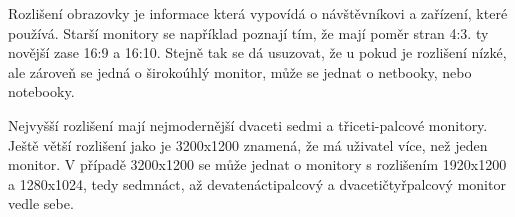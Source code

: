 \documentclass[bc,male,java,dept456]{diploma}						%
\begin{document}
Rozlišení obrazovky je informace která vypovídá o návštěvníkovi a zařízení, které po\-u\-ží\-vá. Starší monitory se například poznají tím, že mají poměr stran 4:3. ty novější zase 16:9 a 16:10. Stejně tak se dá usuzovat, že u pokud je rozlišení nízké, ale zároveň se jedná o širokoúhlý monitor, může se jednat o netbooky, nebo notebooky.

Nejvyšší rozlišení mají nejmodernější dvaceti sedmi a třiceti-palcové monitory. Ještě větší rozlišení jako je 3200x1200 znamená, že má uživatel více, než jeden monitor. V případě 3200x1200 se může jednat o monitory s rozlišením 1920x1200 a 1280x1024, tedy sedmnáct, až devatenáctipalcový a dvacetičtyřpalcový monitor vedle sebe.




 


  

\bigskip
  

\end{document}
